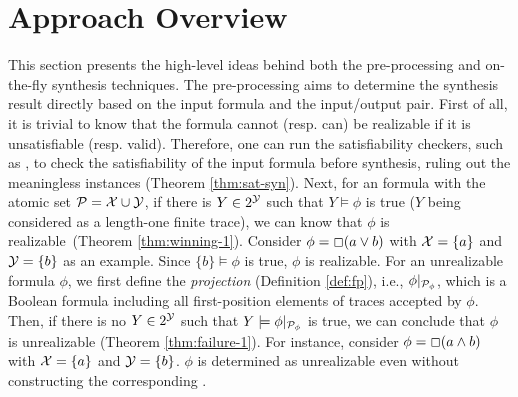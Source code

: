 \section{Approach Overview}
This section presents the high-level ideas behind both the pre-processing and on-the-fly synthesis techniques. The pre-processing aims to determine the synthesis result directly based on the input formula and the input/output pair. First of all, it is trivial to know that the formula cannot (resp. can) be realizable if it is unsatisfiable (resp. valid). Therefore, one can run the satisfiability checkers, such as \aaltaf\citep{LRPZV19}, to check the satisfiability of the input formula before synthesis, ruling out the meaningless instances (Theorem \ref{thm:sat-syn}). Next, for an \ltlf formula with the atomic set $\P = \X\cup\Y$, if there is $Y\in 2^{\Y}$ such that $Y\models\phi$ is true ($Y$ being considered as a length-one finite trace), we can know that $\phi$ is realizable~(Theorem \ref{thm:winning-1}). Consider $\phi = \G (a\vee b)$ with $\X=\{a\}$ and $\Y=\{b\}$ as an example. Since $\{b\}\models\phi$ is true, $\phi$ is realizable. 
For an unrealizable formula $\phi$, we first define the \emph{projection} (Definition \ref{def:fp}), i.e., $\phi|_{\P_{\phi}}$, which is a Boolean formula including all first-position elements of traces accepted by $\phi$. Then, if there is no $Y\in 2^{\Y}$ such that $Y\models\phi|_{\P_{\phi}}$ is true, we can conclude that $\phi$ is unrealizable (Theorem \ref{thm:failure-1}). For instance, consider $\phi = \G (a\wedge b)$ with $\X=\{a\}$ and $\Y=\{b\}$. $\phi$ is determined as unrealizable even without constructing the corresponding \dfa. 


